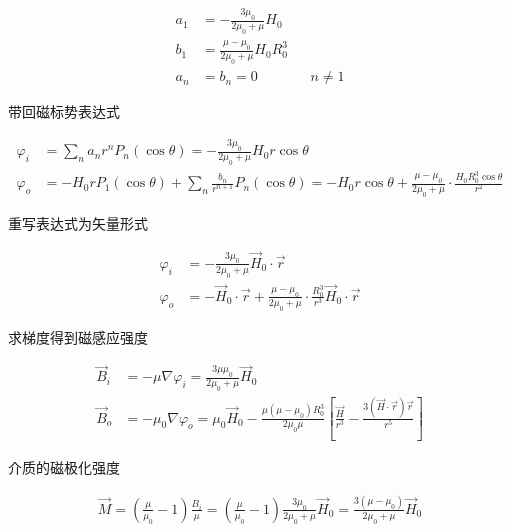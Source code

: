 \documentclass{article}
\begin{document}
\begin{equation*}
  \begin{aligned}
    a_1 &= - \frac{3 \mu_{0}}{2 \mu_{0} + \mu} H_0 \\
    b_1 &= \frac{\mu - \mu_{0}}{2\mu_0 + \mu} H_0 R_0^3 \\
    a_n &= b_n = 0 && n \neq 1
  \end{aligned}
\end{equation*}

带回磁标势表达式

\begin{equation*}
  \begin{aligned}
    \varphi_i &= \sum_n a_n r^n P_n \left( \cos \theta \right)
    = - \frac{3 \mu_{0}}{2 \mu_{0} + \mu} H_0 r \cos \theta \\
    \varphi_o &= - H_0 r P_1 \left( \cos \theta \right) + \sum_n \frac{b_{n}}{r^{n+1}} P_n \left( \cos \theta \right)
    = - H_0 r \cos \theta + \frac{\mu - \mu_{0}}{2\mu_0 + \mu} \cdot \frac{H_0 R_0^3 \cos \theta}{r^{2}}
  \end{aligned}
\end{equation*}

重写表达式为矢量形式

\begin{equation*}
  \begin{aligned}
    \varphi_i &= - \frac{3 \mu_{0}}{2 \mu_{0} + \mu} \vec{H}_0 \cdot \vec{r} \\
    \varphi_o &= - \vec{H}_0 \cdot \vec{r} + \frac{\mu - \mu_{0}}{2\mu_0 + \mu} \cdot \frac{R_0^3 }{r^{3}} \vec{H}_0 \cdot \vec{r}
  \end{aligned}
\end{equation*}

求梯度得到磁感应强度

\begin{equation*}
  \begin{aligned}
    \vec{B}_i &= - \mu \nabla \varphi_i = \frac{3 \mu \mu_{0}}{2\mu_{0} + \mu} \vec{H}_0 \\
    \vec{B}_o &= - \mu_0 \nabla \varphi_o = \mu_0 \vec{H}_0 - \frac{\mu \left( \mu - \mu_0 \right) R_0^3}{2 \mu_0  \mu} \left[ \frac{\vec{H}}{r^{3}} - \frac{3 \left( \vec{H} \cdot \vec{r} \right) \vec{r}}{r^5} \right] 
  \end{aligned}
\end{equation*}

介质的磁极化强度

\begin{equation*}
  \begin{aligned}
    \vec{M} = \left( \frac{\mu}{\mu_{0}} - 1 \right) \frac{B_{i}}{\mu}
    = \left(\frac{\mu}{\mu_{0}} - 1 \right) \frac{3 \mu_{0}}{2\mu_{0} + \mu} \vec{H}_0 
    = \frac{3 \left( \mu - \mu_0 \right)}{2\mu_{0} + \mu} \vec{H}_0 
  \end{aligned}
\end{equation*}
\end{document}
